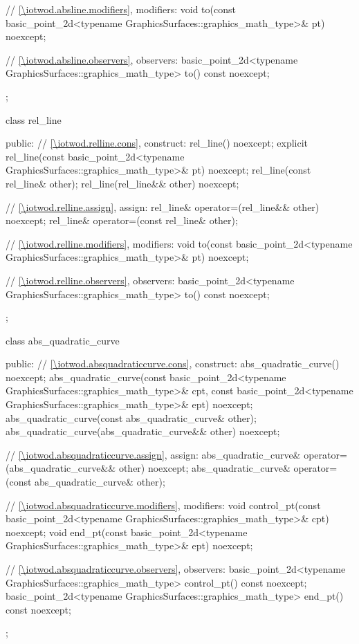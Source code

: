 \begin{codeblock}
{{{      // \ref{\iotwod.absline.modifiers}, modifiers:
      void to(const basic_point_2d<typename GraphicsSurfaces::graphics_math_type>& pt) noexcept;

      // \ref{\iotwod.absline.observers}, observers:
      basic_point_2d<typename GraphicsSurfaces::graphics_math_type> to() const noexcept;
    };

    class rel_line {
    public:
      // \ref{\iotwod.relline.cons}, construct:
      rel_line() noexcept;
      explicit rel_line(const basic_point_2d<typename
        GraphicsSurfaces::graphics_math_type>& pt) noexcept;
      rel_line(const rel_line& other);
      rel_line(rel_line&& other) noexcept;

      // \ref{\iotwod.relline.assign}, assign:
      rel_line& operator=(rel_line&& other) noexcept;
      rel_line& operator=(const rel_line& other);

      // \ref{\iotwod.relline.modifiers}, modifiers:
      void to(const basic_point_2d<typename GraphicsSurfaces::graphics_math_type>& pt) noexcept;

      // \ref{\iotwod.relline.observers}, observers:
      basic_point_2d<typename GraphicsSurfaces::graphics_math_type> to() const noexcept;
    };

    class abs_quadratic_curve {
    public:
      // \ref{\iotwod.absquadraticcurve.cons}, construct:
      abs_quadratic_curve() noexcept;
      abs_quadratic_curve(const basic_point_2d<typename
        GraphicsSurfaces::graphics_math_type>& cpt, const basic_point_2d<typename
        GraphicsSurfaces::graphics_math_type>& ept) noexcept;
      abs_quadratic_curve(const abs_quadratic_curve& other);
      abs_quadratic_curve(abs_quadratic_curve&& other) noexcept;

      // \ref{\iotwod.absquadraticcurve.assign}, assign:
      abs_quadratic_curve& operator=(abs_quadratic_curve&& other) noexcept;
      abs_quadratic_curve& operator=(const abs_quadratic_curve& other);

      // \ref{\iotwod.absquadraticcurve.modifiers}, modifiers:
      void control_pt(const basic_point_2d<typename
        GraphicsSurfaces::graphics_math_type>& cpt) noexcept;
      void end_pt(const basic_point_2d<typename
        GraphicsSurfaces::graphics_math_type>& ept) noexcept;

      // \ref{\iotwod.absquadraticcurve.observers}, observers:
      basic_point_2d<typename GraphicsSurfaces::graphics_math_type> control_pt() const noexcept;
      basic_point_2d<typename GraphicsSurfaces::graphics_math_type> end_pt() const noexcept;
    };

}}
\end{codeblock}
